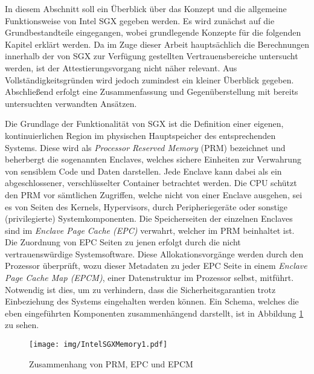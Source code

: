 In diesem Abschnitt soll ein Überblick über das Konzept und die allgemeine Funktionsweise von Intel SGX gegeben werden. Es wird zunächst auf die Grundbestandteile eingegangen, wobei grundlegende Konzepte für die folgenden Kapitel erklärt werden. Da im Zuge dieser Arbeit hauptsächlich die Berechnungen innerhalb der von SGX zur Verfügung gestellten Vertrauensbereiche untersucht werden, ist der Attestierungsvorgang nicht näher relevant. Aus Vollständigkeitsgründen wird jedoch zumindest ein kleiner Überblick gegeben. Abschließend erfolgt eine Zusammenfassung und Gegenüberstellung mit bereits untersuchten verwandten Ansätzen.

Die Grundlage der Funktionalität von SGX ist die Definition einer eigenen, kontinuierlichen Region im physischen Hauptspeicher des entsprechenden Systems. Diese wird als \textit{Processor Reserved Memory} (PRM) bezeichnet und beherbergt die sogenannten Enclaves, welches sichere Einheiten zur Verwahrung von sensiblem Code und Daten darstellen. Jede Enclave kann dabei als ein abgeschlossener, verschlüsselter Container betrachtet werden. Die CPU schützt den PRM vor sämtlichen Zugriffen, welche nicht von einer Enclave ausgehen, sei es von Seiten des Kernels, Hypervisors, durch Peripheriegeräte oder sonstige (privilegierte) Systemkomponenten. Die Speicherseiten der einzelnen Enclaves sind im \textit{Enclave Page Cache (EPC)} verwahrt, welcher im PRM beinhaltet ist. Die Zuordnung von EPC Seiten zu jenen erfolgt durch die nicht vertrauenswürdige Systemsoftware. Diese Allokationsvorgänge werden durch den Prozessor überprüft, wozu dieser Metadaten zu jeder EPC Seite in einem \textit{Enclave Page Cache Map (EPCM)}, einer Datenstruktur im Prozessor selbst, mitführt. Notwendig ist dies, um zu verhindern, dass die Sicherheitsgarantien trotz Einbeziehung des Systems eingehalten werden können. Ein Schema, welches die eben eingeführten Komponenten zusammenhängend darstellt, ist in Abbildung \ref{fig:intelsgxmemory1} zu sehen. 

\begin{figure}
	\texttt{[image: img/IntelSGXMemory1.pdf]}
	\centering
	\caption{Zusammenhang von PRM, EPC und EPCM}
	\label{fig:intelsgxmemory1}
\end{figure}

